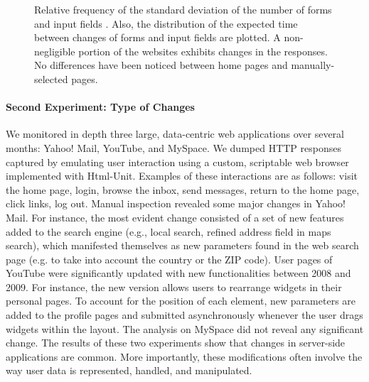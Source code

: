 \begin{figure}[t]
  \caption{Relative frequency of the standard deviation of the number
    of forms \protect{} and input
    fields \protect{}. Also, the
    distribution of the expected time between changes of forms
    \protect{} and input fields
    \protect{} are plotted. A
    non-negligible portion of the websites exhibits changes in the
    responses. No differences have been noticed between home pages and
    manually-selected pages.}
  \label{fig:website-features-changes}
  \vspace*{-.65cm}
\end{figure}

\paragraph{Second Experiment: Type of Changes}
We monitored in depth three large, data-centric web applications over several months: \textsf{Yahoo!  Mail}, \textsf{YouTube}, and \textsf{MySpace}. We dumped \ac{HTTP} responses captured by emulating user interaction using a custom, scriptable web browser implemented with \textsf{Html\hyp{}Unit}. Examples of these interactions are as follows: visit the home page, login, browse the inbox, send messages, return to the home page, click links, log out. Manual inspection revealed some major changes in \textsf{Yahoo! Mail}. For instance, the most evident change consisted of a set of new features added to the search engine (e.g., local search, refined address field in maps search), which manifested themselves as new parameters found in the web search page (e.g. to take into account the country or the ZIP code). User pages of \textsf{YouTube} were significantly updated with new functionalities between 2008 and 2009. For instance, the new version allows users to rearrange widgets in their personal pages. To account for the position of each element, new parameters are added to the profile pages and submitted asynchronously whenever the user drags widgets within the layout. The analysis on \textsf{MySpace} did not reveal any significant change. The results of these two experiments show that changes in server-side applications are common. More importantly, these modifications often involve the way user data is represented, handled, and manipulated.

